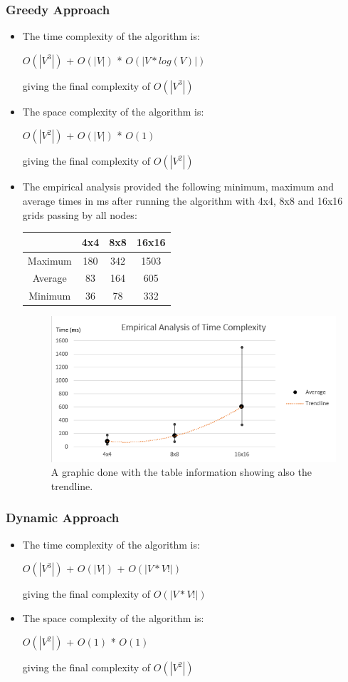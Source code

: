 \documentclass{article}
\begin{document}
\subsubsection*{Greedy Approach}
\begin{itemize}
\item The time complexity of the algorithm is:
    \begin{center}
    $O(|V^3|)$ + $O(|V|)$ * $O(|V * log(V)|)$
    \end{center}
giving the final complexity of $O(|V^3|)$
\item The space complexity of the algorithm is:
    \begin{center}
    $O(|V^2|)$ + $O(|V|)$ * $O(1)$
    \end{center}
giving the final complexity of $O(|V^2|)$
\item The empirical analysis provided the following minimum, maximum and average times in ms after running the algorithm with 4x4, 8x8 and 16x16 grids passing by all nodes:
\begin{center}
\begin{tabular}{|c|c|c|c|} 
    \hline
     & 4x4 & 8x8 & 16x16 \\ [0.5ex] 
    \hline
    Maximum & 180 & 342 & 1503 \\ 
    \hline
    Average & 83 & 164 & 605 \\
    \hline
    Minimum & 36 & 78 & 332 \\
    \hline
\end{tabular}
\end{center}
\begin{figure}[h!]
    \centering
    \includegraphics[width=0.6\linewidth]{graphic.png}
    \caption{A graphic done with the table information showing also the trendline.}
\end{figure}
\end{itemize}


\subsubsection*{Dynamic Approach}
\begin{itemize}
\item The time complexity of the algorithm is:
    \begin{center}
    $O(|V^3|)$ + $O(|V|)$ + $O(|V * V!|)$
    \end{center}
giving the final complexity of $O(|V * V!|)$
\item The space complexity of the algorithm is:
    \begin{center}
    $O(|V^2|)$ + $O(1)$ * $O(1)$
    \end{center}
giving the final complexity of $O(|V^2|)$
\end{itemize}
\end{document}
